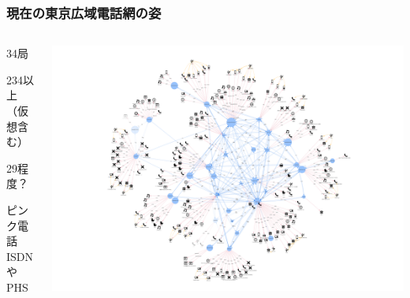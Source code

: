 \documentclass[
  lualatex,
  aspectratio=169,
  14pt
]{beamer}
\begin{document}
\begin{frame}
  \frametitle{現在の東京広域電話網の姿}

  \begin{columns}
    \begin{column}{.28\textwidth}
      \begin{description}[labelwidth=\linewidth]
        \item[交換局数]
          34局
        \item[端末数]
          234以上\\
          （仮想含む）
        \item[うち黒電話]
          29程度？
        \item[その他]
          ピンク電話\\
          ISDNやPHS
      \end{description}
    \end{column}
    \begin{column}{.7\textwidth}
      \centering
      \includegraphics[height=.9\textheight]{./images/mantela.png}
    \end{column}
  \end{columns}

\end{frame}
\end{document}
